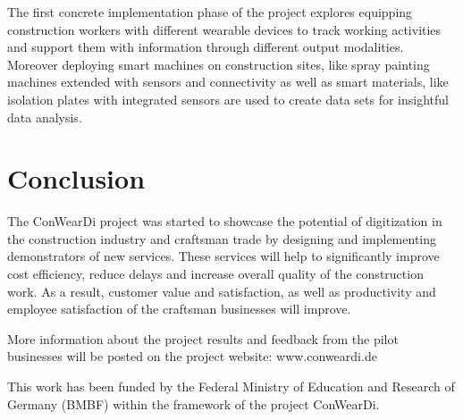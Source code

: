 The first concrete implementation phase of the project explores equipping construction workers with different wearable devices to track working activities and support them with information through different output modalities.
Moreover deploying smart machines on construction sites, like spray painting machines extended with sensors and connectivity as well as smart materials, like isolation plates with integrated sensors are used to create data sets for insightful data analysis.

\section{Conclusion}
The ConWearDi project was started to showcase the potential of digitization in the construction industry and craftsman trade by designing and implementing demonstrators of new services.
These services will help to significantly improve cost efficiency, reduce delays and increase overall quality of the construction work.
As a result, customer value and satisfaction, as well as productivity and employee satisfaction of the craftsman businesses will improve. 

More information about the project results and feedback from the pilot businesses will be posted on the project website: www.conweardi.de

\begin{acks}
  This work has been funded by the Federal Ministry of Education and Research of Germany (BMBF) within the framework of the project ConWearDi.
\end{acks}
